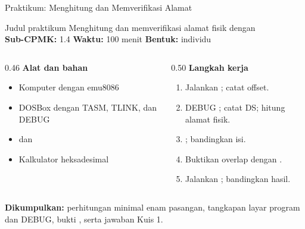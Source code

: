 \documentclass[aspectratio=169,11pt]{beamer}
\begin{document}
\begin{frame}{Praktikum: Menghitung dan Memverifikasi Alamat}
\begin{block}{Judul praktikum}
\small Menghitung dan memverifikasi alamat fisik dengan
\\[0.15em]
\textbf{Sub-CPMK:} 1.4 \quad\textbullet\quad
\textbf{Waktu:} 100 menit \quad\textbullet\quad
\textbf{Bentuk:} individu
\end{block}

\vspace{0.2em}
\begin{columns}[t]
\begin{column}{0.46\textwidth}
{\color{obeBlue}\bfseries Alat dan bahan}
\begin{itemize}\footnotesize
    \item Komputer dengan emu8086
    \item DOSBox dengan TASM, TLINK, dan DEBUG
    \item {} dan 
    \item Kalkulator heksadesimal
\end{itemize}
\end{column}
\begin{column}{0.50\textwidth}
{\color{obeBlue}\bfseries Langkah kerja}
\begin{enumerate}\footnotesize
    \item Jalankan ; catat offset.
    \item DEBUG ; catat DS; hitung alamat fisik.
    \item {}; bandingkan isi.
    \item Buktikan overlap dengan .
    \item Jalankan ; bandingkan hasil.
\end{enumerate}
\end{column}
\end{columns}

\vspace{0.2em}
{\footnotesize\textbf{Dikumpulkan:} perhitungan minimal enam
pasangan, tangkapan layar program dan DEBUG, bukti
, serta jawaban Kuis 1.\par}
\end{frame}
\end{document}
